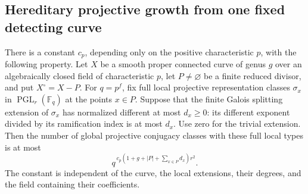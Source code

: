 \subsection{Hereditary projective growth from one fixed detecting curve}

\begin{lemma}
\label{D:curve-fixed-local-growth-numerical}
There is a constant \(c_p\), depending only on the positive
characteristic \(p\), with the following property.
Let \(X\) be a smooth proper connected curve of genus \(g\)
over an algebraically closed field of characteristic \(p\),
let \(P\ne\varnothing\) be a finite reduced divisor, and put
\(X^\circ=X-P\).
For \(q=p^f\), fix full local projective representation
classes \(\sigma_x\) in \(\operatorname{PGL}_r(\mathbb F_q)\)
at the points \(x\in P\).
Suppose that the finite Galois splitting extension of
\(\sigma_x\) has normalized different at most \(d_x\ge0\):
its different exponent divided by its ramification index
is at most \(d_x\). Use zero for the trivial extension.
Then the number of global projective conjugacy classes
with these full local types is at most
\[
 q^{\,c_p\left(1+g+|P|+\sum_{x\in P}d_x\right)r^2}.
                                                        \tag{D.GH.1}
\]
The constant is independent of the curve, the local extensions,
their degrees, and the field containing their coefficients.
\end{lemma}

